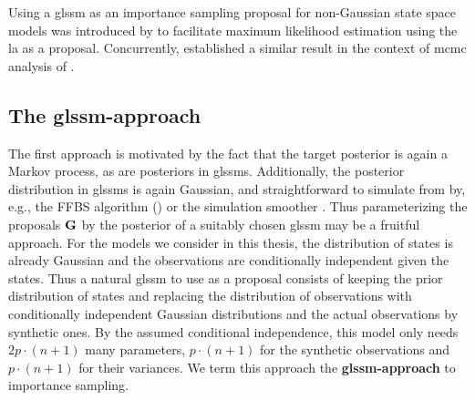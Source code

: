Using a \acrshort{glssm} as an importance sampling proposal for non-Gaussian state space models was introduced by \citep{Durbin1997Monte} to facilitate maximum likelihood estimation using the \acrshort{la} as a proposal. Concurrently, \citep{Shephard1997Likelihood} established a similar result in the context of \acrshort{mcmc} analysis of .

\subsection{\texorpdfstring{The \gls{glssm}-approach}{The GLSSM-approach}}
\label{subsec:glssm-approach}
The first approach is motivated by the fact that the target posterior is again a Markov process, as are posteriors in \glspl{glssm}. Additionally, the posterior distribution in \gls{glssm}s is again Gaussian, and straightforward to simulate from by, e.g., the FFBS algorithm () or the simulation smoother \citep{Durbin2002Simple}. Thus parameterizing the proposals $\mathbf G$ by the posterior of a suitably chosen \gls{glssm} may be a fruitful approach.
For the models we consider in this thesis, the distribution of states is already Gaussian and the observations are conditionally independent given the states. Thus a natural \gls{glssm} to use as a proposal consists of keeping the prior distribution of states and replacing the distribution of observations with conditionally independent Gaussian distributions and the actual observations by synthetic ones. By the assumed conditional independence, this model only needs $2 p\cdot (n + 1)$ many parameters, $p\cdot (n + 1)$ for the synthetic observations and $p\cdot (n + 1)$ for their variances. We term this approach the \textbf{\gls{glssm}-approach} to importance sampling.

